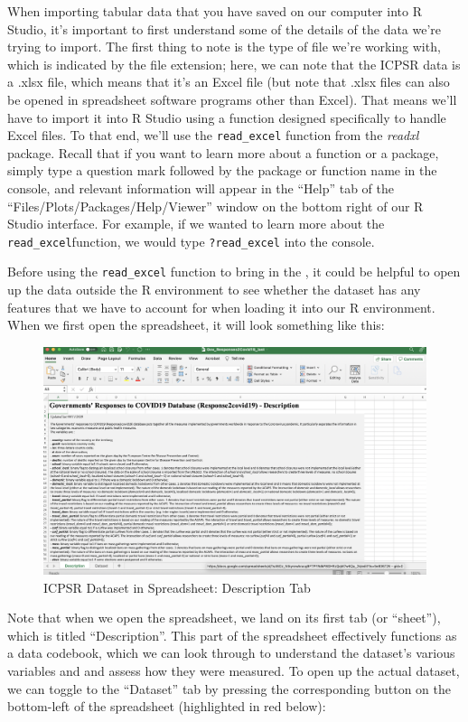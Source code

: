 \documentclass[
]{article}
\begin{document}
When importing tabular data that you have saved on our computer into R Studio, it's important to first understand some of the details of the data we're trying to import. The first thing to note is the type of file we're working with, which is indicated by the file extension; here, we can note that the ICPSR data is a .xlsx file, which means that it's an Excel file (but note that .xlsx files can also be opened in spreadsheet software programs other than Excel). That means we'll have to import it into R Studio using a function designed specifically to handle Excel files. To that end, we'll use the \texttt{read\_excel} function from the \emph{readxl} package. Recall that if you want to learn more about a function or a package, simply type a question mark followed by the package or function name in the console, and relevant information will appear in the ``Help'' tab of the ``Files/Plots/Packages/Help/Viewer'' window on the bottom right of our R Studio interface. For example, if we wanted to learn more about the \texttt{read\_excel}function, we would type \texttt{?read\_excel} into the console.

Before using the \texttt{read\_excel} function to bring in the , it could be helpful to open up the data outside the R environment to see whether the dataset has any features that we have to account for when loading it into our R environment. When we first open the spreadsheet, it will look something like this:

\begin{figure}
\includegraphics[width=1\linewidth]{images/excel_open} \caption{ICPSR Dataset in Spreadsheet: Description Tab}\label{fig:unnamed-chunk-10}
\end{figure}

Note that when we open the spreadsheet, we land on its first tab (or ``sheet''), which is titled ``Description''. This part of the spreadsheet effectively functions as a data codebook, which we can look through to understand the dataset's various variables and and assess how they were measured. To open up the actual dataset, we can toggle to the ``Dataset'' tab by pressing the corresponding button on the bottom-left of the spreadsheet (highlighted in red below):
\end{document}
